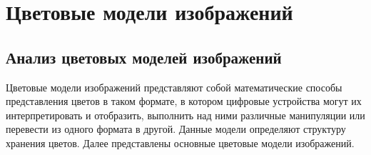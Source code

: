 \section{Цветовые модели изображений}

\subsection{Анализ цветовых моделей изображений}

Цветовые модели изображений представляют собой математические способы представления цветов в таком формате, в котором цифровые устройства могут их интерпретировать и отобразить, выполнить над ними различные манипуляции или перевести из одного формата в другой. Данные модели определяют структуру хранения цветов. Далее представлены основные цветовые модели изображений.

